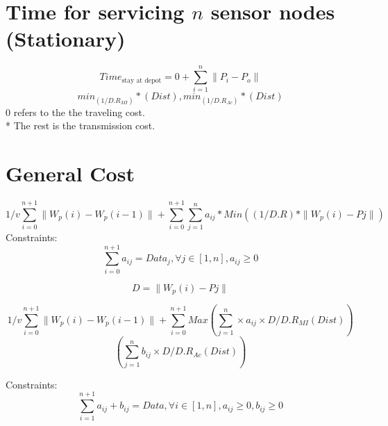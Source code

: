 \documentclass{article}
\begin{document}
\section{Time for servicing $n$ sensor nodes (Stationary)}

\begin{equation}
    \label{equation_2}
    Time_{\textrm{stay at depot}} = 0 + \sum_{i=1}^{n} \|P_{i}-P_{o}\| 
    \end{equation} 
\begin{equation}
    \label{equation_3}
    min_{(1/D.R_{MI})}*(Dist),min_{(1/D.R_{Ac})}*(Dist)  
\end{equation}
0 refers to the the traveling cost.\\*
The rest is the transmission cost.

\section{General Cost}
\label{equation_4}
\begin{equation}
1/v \sum_{i=0}^{n+1} \|W_{p}(i)-W_{p}(i-1)\|+\sum_{i=0}^{n+1}\sum_{j=1}^{n} a_{ij}*Min ((1/D.R)*\|W_{p}(i)-P{j}\|)
\end{equation}
Constraints:
\label{equation_5}
\begin{equation}
\sum_{i=0}^{n+1} a_{ij} = Data_{j}, \forall j \in [1,n], 
 a_{ij}\geq 0
\end{equation}

\label{equation_6}
\begin{equation}
D = \|W_{p}(i)-P{j}\|
\end{equation}

\label{equation_7}
\begin{equation}
1/v \sum_{i=0}^{n+1} \|W_{p}(i)-W_{p}(i-1)\|+\sum_{i=0}^{n+1}Max(\sum_{j=1}^{n} \times a_{ij}\times D/D.R_{MI}(Dist))  
\end{equation}
\begin{equation}
(\sum_{j=1}^{n} b_{ij}\times D/D.R_{Ac}(Dist))
\end{equation}

Constraints:
\label{equation_8}
\begin{equation}
\sum_{i=1}^{n+1} a_{ij}+b_{ij}=Data,\forall i \in [1,n], 
 a_{ij}\geq 0,b_{ij}\geq 0
\end{equation}
\end{document}
